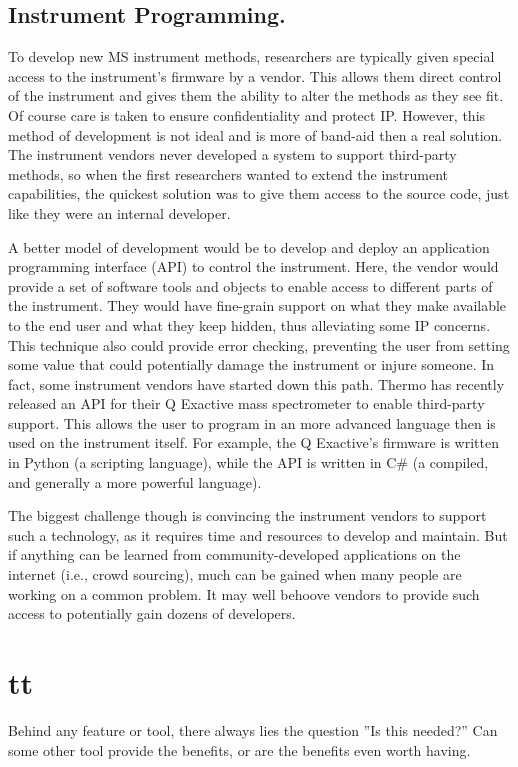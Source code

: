 \subsection*{Instrument Programming.}
To develop new MS instrument methods, researchers are typically given special access to the instrument's firmware by a vendor. This allows them direct control of the instrument and gives them the ability to alter the methods as they see fit. Of course care is taken to ensure confidentiality and protect IP. However, this method of development is not ideal and is more of band-aid then a real solution. The instrument vendors never developed a system to support third-party methods, so when the first researchers wanted to extend the instrument capabilities, the quickest solution was to give them access to the source code, just like they were an internal developer.

A better model of development would be to develop and deploy an application programming interface (API) to control the instrument. Here, the vendor would provide a set of software tools and objects to enable access to different parts of the instrument. They would have fine-grain support on what they make available to the end user and what they keep hidden, thus alleviating some IP concerns. This technique also could provide error checking, preventing the user from setting some value that could potentially damage the instrument or injure someone. In fact, some instrument vendors have started down this path. Thermo has recently released an API for their Q Exactive mass spectrometer to enable third-party support. This allows the user to program in an more advanced language then is used on the instrument itself. For example, the Q Exactive's firmware is written in Python (a scripting language), while the API is written in C\# (a compiled, and generally a more powerful language).

The biggest challenge though is convincing the instrument vendors to support such a technology, as it requires time and resources to develop and maintain. But if anything can be learned from community-developed applications on the internet (i.e., crowd sourcing), much can be gained when many people are working on a common problem. It may well behoove vendors to provide such access to potentially gain dozens of developers.

\section{tt}
Behind any feature or tool, there always lies the question ''Is this needed?'' Can some other tool provide the benefits, or are the benefits even worth having.
